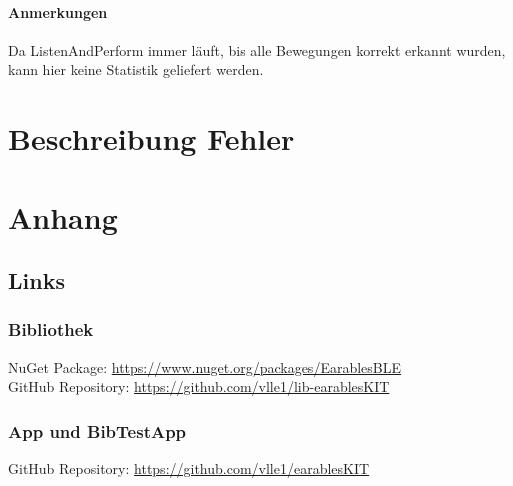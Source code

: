 \documentclass[a4paper,12pt]{article}
\begin{document}
\paragraph{Anmerkungen}
Da ListenAndPerform immer läuft, bis alle Bewegungen korrekt erkannt wurden, kann hier keine Statistik geliefert werden.

\section{Beschreibung Fehler}
\section{Anhang}
\subsection{Links}
\subsubsection{Bibliothek}
NuGet Package: \url{https://www.nuget.org/packages/EarablesBLE}\\
GitHub Repository: \url{https://github.com/vlle1/lib-earablesKIT}
\subsubsection{App und BibTestApp}
GitHub Repository: \url{https://github.com/vlle1/earablesKIT}


\printglossaries
{}
\end{document}
